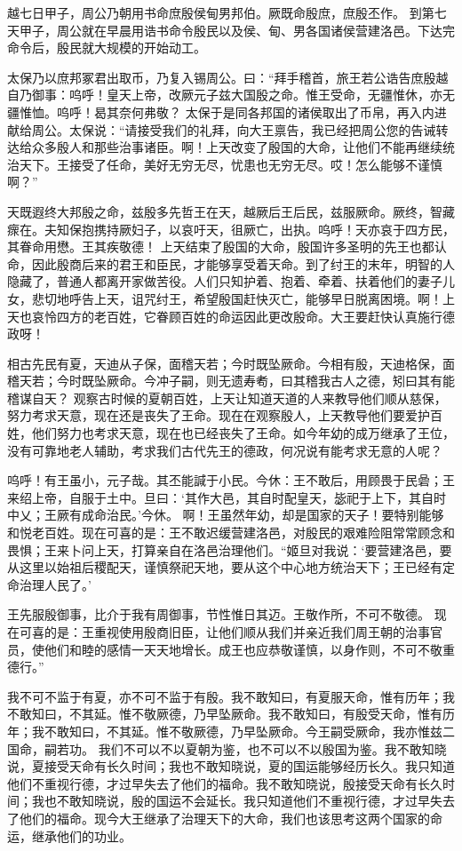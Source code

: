 \documentclass[a4paper,12pt,UTF8,twoside]{ctexbook}
\begin{document}
越七日甲子，周公乃朝用书命庶殷侯甸男邦伯。厥既命殷庶，庶殷丕作。
到第七天甲子，周公就在早晨用诰书命令殷民以及侯、甸、男各国诸侯营建洛邑。下达完命令后，殷民就大规模的开始动工。

太保乃以庶邦冢君出取币，乃复入锡周公。曰：“拜手稽首，旅王若公诰告庶殷越自乃御事：呜呼！皇天上帝，改厥元子兹大国殷之命。惟王受命，无疆惟休，亦无疆惟恤。呜呼！曷其奈何弗敬？
太保于是同各邦国的诸侯取出了币帛，再入内进献给周公。太保说：“请接受我们的礼拜，向大王禀告，我已经把周公您的告诫转达给众多殷人和那些治事诸臣。啊！上天改变了殷国的大命，让他们不能再继续统治天下。王接受了任命，美好无穷无尽，忧患也无穷无尽。哎！怎么能够不谨慎啊？”

天既遐终大邦殷之命，兹殷多先哲王在天，越厥后王后民，兹服厥命。厥终，智藏瘝在。夫知保抱携持厥妇子，以哀吁天，徂厥亡，出执。呜呼！天亦哀于四方民，其眷命用懋。王其疾敬德！
上天结束了殷国的大命，殷国许多圣明的先王也都认命，因此殷商后来的君王和臣民，才能够享受着天命。到了纣王的末年，明智的人隐藏了，普通人都离开家做苦役。人们只知护着、抱着、牵着、扶着他们的妻子儿女，悲切地呼告上天，诅咒纣王，希望殷国赶快灭亡，能够早日脱离困境。啊！上天也哀怜四方的老百姓，它眷顾百姓的命运因此更改殷命。大王要赶快认真施行德政呀！

相古先民有夏，天迪从子保，面稽天若；今时既坠厥命。今相有殷，天迪格保，面稽天若；今时既坠厥命。今冲子嗣，则无遗寿耇，曰其稽我古人之德，矧曰其有能稽谋自天？
观察古时候的夏朝百姓，上天让知道天道的人来教导他们顺从慈保，努力考求天意，现在还是丧失了王命。现在在观察殷人，上天教导他们要爱护百姓，他们努力也考求天意，现在也已经丧失了王命。如今年幼的成万继承了王位，没有可靠地老人辅助，考求我们古代先王的德政，何况说有能考求无意的人呢？

呜呼！有王虽小，元子哉。其丕能諴于小民。今休：王不敢后，用顾畏于民碞；王来绍上帝，自服于土中。旦曰：‘其作大邑，其自时配皇天，毖祀于上下，其自时中乂；王厥有成命治民。’今休。
啊！王虽然年幼，却是国家的天子！要特别能够和悦老百姓。现在可喜的是：王不敢迟缓营建洛邑，对殷民的艰难险阻常常顾念和畏惧；王来卜问上天，打算亲自在洛邑治理他们。“姬旦对我说：‘要营建洛邑，要从这里以始祖后稷配天，谨慎祭祀天地，要从这个中心地方统治天下；王已经有定命治理人民了。’

王先服殷御事，比介于我有周御事，节性惟日其迈。王敬作所，不可不敬德。
现在可喜的是：王重视使用殷商旧臣，让他们顺从我们并亲近我们周王朝的治事官员，使他们和睦的感情一天天地增长。成王也应恭敬谨慎，以身作则，不可不敬重德行。”

我不可不监于有夏，亦不可不监于有殷。我不敢知曰，有夏服天命，惟有历年；我不敢知曰，不其延。惟不敬厥德，乃早坠厥命。我不敢知曰，有殷受天命，惟有历年；我不敢知曰，不其延。惟不敬厥德，乃早坠厥命。今王嗣受厥命，我亦惟兹二国命，嗣若功。
我们不可以不以夏朝为鉴，也不可以不以殷国为鉴。我不敢知晓说，夏接受天命有长久时间；我也不敢知晓说，夏的国运能够经历长久。我只知道他们不重视行德，才过早失去了他们的福命。我不敢知晓说，殷接受天命有长久时间；我也不敢知晓说，殷的国运不会延长。我只知道他们不重视行德，才过早失去了他们的福命。现今大王继承了治理天下的大命，我们也该思考这两个国家的命运，继承他们的功业。
\end{document}
